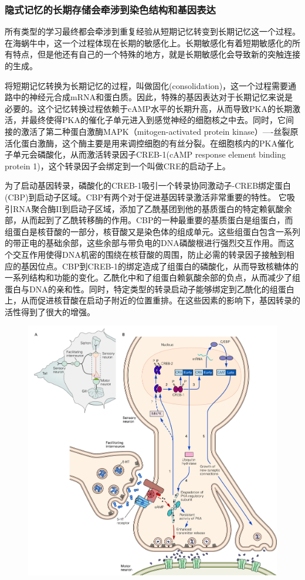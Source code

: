 \documentclass[UTF8,nofonts]{ctexart}
\begin{document}
\subsubsection{隐式记忆的长期存储会牵涉到染色结构和基因表达}
所有类型的学习最终都会牵涉到重复经验从短期记忆转变到长期记忆这一个过程。在海蜗牛中，这一个过程体现在长期的敏感化上。长期敏感化有着短期敏感化的所有特点，但是他还有自己的一个特殊的地方，就是长期敏感化会导致新的突触连接的生成。
\par
将短期记忆转换为长期记忆的过程，叫做固化(consolidation)，这一个过程需要通路中的神经元合成mRNA和蛋白质。因此，特殊的基因表达对于长期记忆来说是必要的。这个记忆转换过程依赖于cAMP水平的长期升高，从而导致PKA的长期激活，并最终使得PKA的催化子单元进入到感觉神经的细胞核之中去。同时，它间接的激活了第二种蛋白激酶MAPK（mitogen-activated protein kinase）----丝裂原活化蛋白激酶，这个酶主要是用来调控细胞的有丝分裂。在细胞核内的PKA催化子单元会磷酸化，从而激活转录因子CREB-1(cAMP response element binding protein 1)，这个转录因子会绑定到一个叫做CRE的启动子上。
\par
为了启动基因转录，磷酸化的CREB-1吸引一个转录协同激动子-CREB绑定蛋白(CBP)到启动子区域。CBP有两个对于促进基因转录激活非常重要的特性。 它吸引RNA聚合酶II到启动子区域，添加了乙酰基团到他的基质蛋白的特定赖氨酸余部，从而起到了乙酰转移酶的作用。CBP的一种最重要的基质蛋白是组蛋白，而组蛋白是核苷酸的一部分，核苷酸又是染色体的组成单元。这些组蛋白包含一系列的带正电的基础余部，这些余部与带负电的DNA磷酸根进行强烈交互作用。而这个交互作用使得DNA机密的围绕在核苷酸的周围，防止必需的转录因子接触到相应的基因位点。CBP到CREB-1的绑定造成了组蛋白的磷酸化，从而导致核糖体的一系列结构和功能的变化。乙酰化中和了组蛋白赖氨酸余部的负点，从而减少了组蛋白与DNA的亲和性。同时，特定类型的转录启动子能够绑定到乙酰化的组蛋白上，从而促进核苷酸在启动子附近的位置重排。在这些因素的影响下，基因转录的活性得到了很大的增强。
\begin{figure}[h]
	\centering
	\includegraphics[scale=0.9]{Pic/6606_PNS5.jpg}
\end{figure}
\end{document}
